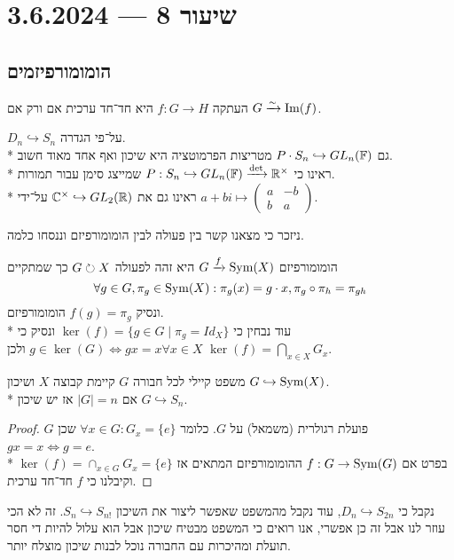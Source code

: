 \section{שיעור 8 --- 3.6.2024}
\subsection{הומומורפיזמים}
\begin{proposition}
	העתקה $f : G \to H$ היא חד־חד ערכית אם ורק אם $G \xrightarrow{\sim} \operatorname{Im}(f)$.
\end{proposition}
\begin{example}
	$D_n \hookrightarrow S_n$ על־פי הגדרה. \\*
	גם $P \cdot S_n \hookrightarrow GL_n(\mathbb{F})$ מטריצות הפרמוטציה היא שיכון ואף אחד מאוד חשוב. \\*
	ראינו כי $P : S_n \hookrightarrow GL_n(\mathbb{F}) \xrightarrow{\det} \mathbb{R}^\times$ שמייצג סימן עבור תמורות. \\*
	ראינו גם את $\mathbb{C}^\times \hookrightarrow GL_2(\mathbb{R})$ על־ידי $a + bi \mapsto \begin{pmatrix} a & -b \\ b & a \end{pmatrix}$.
\end{example}
ניזכר כי מצאנו קשר בין פעולה לבין הומומורפיזם וננסחו כלמה.
\begin{lemma}
	הומומורפיזם $G \xrightarrow{f} \operatorname{Sym}(X)$ היא זהה לפעולה $G \circlearrowright X$  כך שמתקיים
	\[
		\forall g \in G, \pi_g \in \operatorname{Sym}(X) : \pi_g(x) = g \cdot x, \pi_g \circ \pi_h = \pi_{gh}
	\]
	ונסיק $f(g) = \pi_g$ הומומורפיזם. \\*
	עוד נבחין כי $\ker(f) = \{ g \in G \mid \pi_g = Id_X \}$
	ונסיק כי $g \in \ker(G) \iff gx = x \forall x \in X$
	ולכן $\ker(f) = \bigcap_{x \in X} G_x$.
\end{lemma}
\begin{theorem}{משפט קיילי}
	לכל חבורה $G$ קיימת קבוצה $X$ ושיכון $G \hookrightarrow \operatorname{Sym}(X)$. \\*
	אם $|G| = n$ אז יש שיכון $G \hookrightarrow S_n$.
\end{theorem}
\begin{proof}
	$G$ פועלת רגולרית (משמאל) על $G$.
	כלומר $\forall x \in G : G_x = \{e\}$ שכן $gx = x \iff g = e$. \\*
	בפרט אם $f : G \to \operatorname{Sym}(G)$ ההומומורפיזם המתאים אז $\ker(f) = \cap_{x \in G} G_x = \{ e \}$
	וקיבלנו כי $f$ חד־חד ערכית.
\end{proof}
\begin{example}
	נקבל כי $D_n \hookrightarrow S_{2n}$, עוד נקבל מהמשפט שאפשר ליצור את השיכון $S_n \hookrightarrow S_{n!}$.
	זה לא הכי עוזר לנו אבל זה כן אפשרי, אנו רואים כי המשפט מבטיח שיכון אבל הוא עלול להיות די חסר תועלת ומהיכרות עם החבורה נוכל לבנות שיכון מוצלח יותר.
\end{example}
